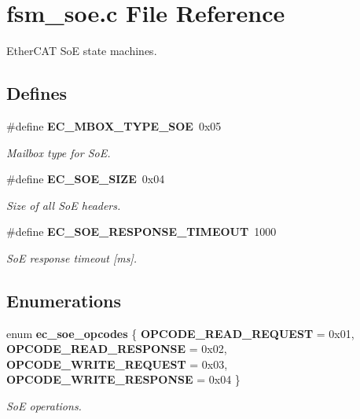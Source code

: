 \section{fsm\-\_\-soe.\-c \-File \-Reference}
\label{fsm__soe_8c}


\-Ether\-C\-A\-T \-So\-E state machines.  


\subsection*{\-Defines}
\begin{DoxyCompactItemize}
\item 
\#define {\bf \-E\-C\-\_\-\-M\-B\-O\-X\-\_\-\-T\-Y\-P\-E\-\_\-\-S\-O\-E}~0x05\label{fsm__soe_8c_ab02cafd2881eb57c288e078ea57736d5}

\begin{DoxyCompactList}\small\item\em \-Mailbox type for \-So\-E. \end{DoxyCompactList}\item 
\#define {\bf \-E\-C\-\_\-\-S\-O\-E\-\_\-\-S\-I\-Z\-E}~0x04\label{fsm__soe_8c_add5bad0251925ce1779bc0d3e186f547}

\begin{DoxyCompactList}\small\item\em \-Size of all \-So\-E headers. \end{DoxyCompactList}\item 
\#define {\bf \-E\-C\-\_\-\-S\-O\-E\-\_\-\-R\-E\-S\-P\-O\-N\-S\-E\-\_\-\-T\-I\-M\-E\-O\-U\-T}~1000\label{fsm__soe_8c_a2e9892fef5e41058583eafca62b7708b}

\begin{DoxyCompactList}\small\item\em \-So\-E response timeout [ms]. \end{DoxyCompactList}\end{DoxyCompactItemize}
\subsection*{\-Enumerations}
\begin{DoxyCompactItemize}
\item 
enum {\bf ec\-\_\-soe\-\_\-opcodes} \{ {\bf \-O\-P\-C\-O\-D\-E\-\_\-\-R\-E\-A\-D\-\_\-\-R\-E\-Q\-U\-E\-S\-T} =  0x01, 
{\bf \-O\-P\-C\-O\-D\-E\-\_\-\-R\-E\-A\-D\-\_\-\-R\-E\-S\-P\-O\-N\-S\-E} =  0x02, 
{\bf \-O\-P\-C\-O\-D\-E\-\_\-\-W\-R\-I\-T\-E\-\_\-\-R\-E\-Q\-U\-E\-S\-T} =  0x03, 
{\bf \-O\-P\-C\-O\-D\-E\-\_\-\-W\-R\-I\-T\-E\-\_\-\-R\-E\-S\-P\-O\-N\-S\-E} =  0x04
 \}
\begin{DoxyCompactList}\small\item\em \-So\-E operations. \end{DoxyCompactList}\end{DoxyCompactItemize}
